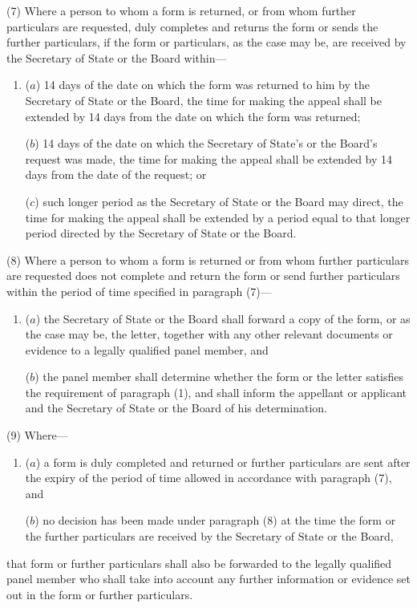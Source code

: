 \documentclass[12pt,a4paper]{article}
\begin{document}
(7) Where a person to whom a form is returned, or from whom further particulars are requested, duly completes and returns the form or sends the further particulars, if the form or particulars, as the case may be, are received by the Secretary of State or the Board within—
\begin{enumerate}\item[]
($a$) 14 days of the date on which the form was returned to him by the Secretary of State or the Board, the time for making the appeal shall be extended by 14 days from the date on which the form was returned;

($b$) 14 days of the date on which the Secretary of State’s or the Board’s request was made, the time for making the appeal shall be extended by 14 days from the date of the request; or

($c$) such longer period as the Secretary of State or the Board may direct, the time for making the appeal shall be extended by a period equal to that longer period directed by the Secretary of State or the Board.
\end{enumerate}

(8) Where a person to whom a form is returned or from whom further particulars are requested does not complete and return the form or send further particulars within the period of time specified in paragraph (7)—
\begin{enumerate}\item[]
($a$) the Secretary of State 
or the Board   %
shall forward a copy of the form, or as the case may be, the letter, together with any other relevant documents or evidence to a legally qualified panel member, and

($b$) the panel member shall determine whether the form or the letter satisfies the requirement of paragraph (1), and shall inform the appellant or applicant and the Secretary of State 
or the Board   %
of his determination.
\end{enumerate}

(9) Where—
\begin{enumerate}\item[]
($a$) a form is duly completed and returned or further particulars are sent after the expiry of the period of time allowed in accordance with paragraph (7), and

($b$) no decision has been made under paragraph (8) at the time the form or the further particulars are received by the Secretary of State
or the Board,   %
\end{enumerate}
that form or further particulars shall also be forwarded to the legally qualified panel member who shall take into account any further information or evidence set out in the form or further particulars.
\end{document}
